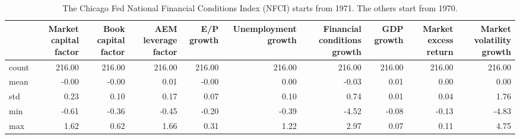 \begin{table}
\caption{The Chicago Fed National Financial Conditions Index (NFCI) starts from 1971. The others start from 1970.}
\label{tab:Table 2.1}
\begin{tabular}{lrrrrrrrrr}
\toprule
 & Market capital factor & Book capital factor & AEM leverage factor & E/P growth & Unemployment growth & Financial conditions growth & GDP growth & Market excess return & Market volatility growth \\
\midrule
count & 216.00 & 216.00 & 216.00 & 216.00 & 216.00 & 216.00 & 216.00 & 216.00 & 216.00 \\
mean & -0.00 & -0.00 & 0.01 & -0.00 & 0.00 & -0.03 & 0.01 & 0.00 & 0.00 \\
std & 0.23 & 0.10 & 0.17 & 0.07 & 0.10 & 0.74 & 0.01 & 0.04 & 1.76 \\
min & -0.61 & -0.36 & -0.45 & -0.20 & -0.39 & -4.52 & -0.08 & -0.13 & -4.83 \\
max & 1.62 & 0.62 & 1.66 & 0.31 & 1.22 & 2.97 & 0.07 & 0.11 & 4.75 \\
\bottomrule
\end{tabular}
\end{table}
